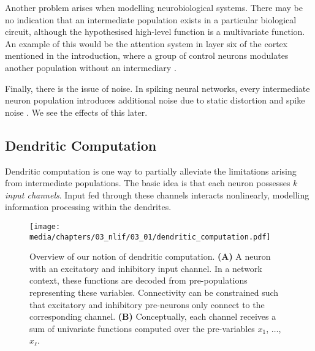 Another problem arises when modelling neurobiological systems.
There may be no indication that an intermediate population exists in a particular biological circuit, although the hypothesised high-level function is a multivariate function.
An example of this would be the attention system in layer six of the cortex mentioned in the introduction, where a group of control neurons modulates another population without an intermediary \citep{bobier2014unifying}.

Finally, there is the issue of noise.
In spiking neural networks, every intermediate neuron population introduces additional noise due to static distortion and spike noise \citep[Section~2.2.2]{eliasmith2003neural}.
We see the effects of this later.

\subsection{Dendritic Computation}
\label{sec:dendritic_computation_theory_dendritic}

Dendritic computation is one way to partially alleviate the limitations arising from intermediate populations.
The basic idea is that each neuron possesses $k$ \emph{input channels}.
Input fed through these channels interacts nonlinearly, modelling information processing within the dendrites.

\begin{figure}
	\texttt{[image: media/chapters/03\_nlif/03\_01/dendritic\_computation.pdf]}%
	{\label{fig:dendritic_computation_net}}%
	{\label{fig:dendritic_computation_fun}}%
	\caption[Overview of our notion of dendritic computation.]{Overview of our notion of dendritic computation. \textbf{(A)} A neuron with an excitatory and inhibitory input channel. In a network context, these functions are decoded from pre-populations representing these variables. Connectivity can be constrained such that excitatory and inhibitory pre-neurons only connect to the corresponding channel. \textbf{(B)} Conceptually, each channel receives a sum of univariate functions computed over the pre-variables $x_1$, $\ldots$, $x_\ell$.}
\end{figure}

